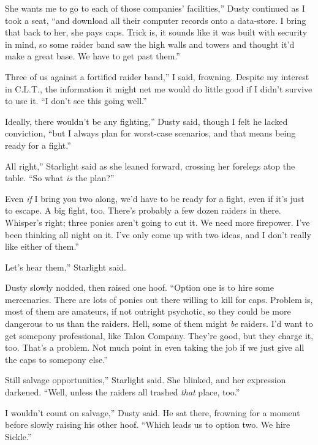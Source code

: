 \leavevmode{}She wants me to go to each of those companies’ facilities,” Dusty continued as I took a seat, “and download all their computer records onto a data-store. I bring that back to her, she pays caps. Trick is, it sounds like it was built with security in mind, so some raider band saw the high walls and towers and thought it’d make a great base. We have to get past them.”

\leavevmode{}Three of us against a fortified raider band,” I said, frowning. Despite my interest in C.L.T., the information it might net me would do little good if I didn’t survive to use it. “I don’t see this going well.”

\leavevmode{}Ideally, there wouldn’t be any fighting,” Dusty said, though I felt he lacked conviction, “but I always plan for worst-case scenarios, and that means being ready for a fight.”

\leavevmode{}All right,” Starlight said as she leaned forward, crossing her forelegs atop the table. “So what \textit{is} the plan?”

\leavevmode{}Even \textit{if} I bring you two along, we’d have to be ready for a fight, even if it’s just to escape. A big fight, too. There’s probably a few dozen raiders in there. Whisper’s right; three ponies aren’t going to cut it. We need more firepower. I’ve been thinking all night on it. I’ve only come up with two ideas, and I don’t really like either of them.”

\leavevmode{}Let’s hear them,” Starlight said.

Dusty slowly nodded, then raised one hoof. “Option one is to hire some mercenaries. There are lots of ponies out there willing to kill for caps. Problem is, most of them are amateurs, if not outright psychotic, so they could be more dangerous to us than the raiders. Hell, some of them might \textit{be} raiders. I’d want to get somepony professional, like Talon Company. They’re good, but they charge it, too. That’s a problem. Not much point in even taking the job if we just give all the caps to somepony else.”

\leavevmode{}Still salvage opportunities,” Starlight said. She blinked, and her expression darkened. “Well, unless the raiders all trashed \textit{that} place, too.”

\leavevmode{}I wouldn’t count on salvage,” Dusty said. He sat there, frowning for a moment before slowly raising his other hoof. “Which leads us to option two. We hire Sickle.”

